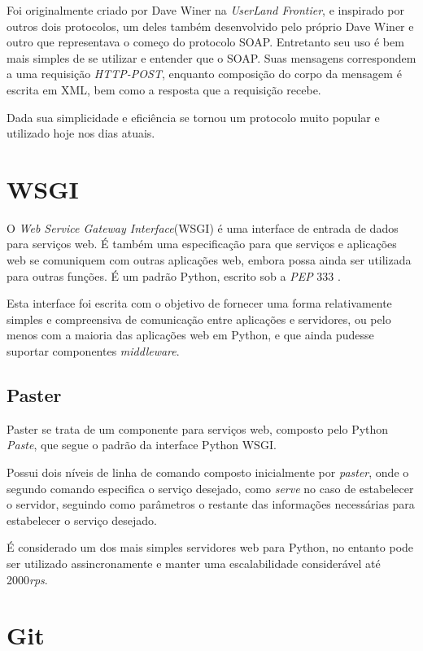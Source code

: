 Foi originalmente criado por Dave Winer na \textit{UserLand Frontier}, e inspirado por outros dois protocolos, um deles também desenvolvido pelo próprio Dave Winer e outro que representava o começo do protocolo SOAP. Entretanto seu uso é bem mais simples de se utilizar e entender que o SOAP. Suas mensagens correspondem a uma requisição \textit{HTTP-POST}, enquanto composição do corpo da mensagem é escrita em XML, bem como a resposta que a requisição recebe.

Dada sua simplicidade e eficiência se tornou um protocolo muito popular e utilizado hoje nos dias atuais.


\section{WSGI}

O \textit{Web Service Gateway Interface}(WSGI) é uma interface de entrada de dados para serviços web. É também uma especificação para que serviços e aplicações web se comuniquem com outras aplicações web, embora possa ainda ser utilizada para outras funções. É um padrão Python, escrito sob a \textit{PEP} 333 \cite{WSGI}.

Esta interface foi escrita com o objetivo de fornecer uma forma relativamente simples e compreensiva de comunicação entre aplicações e servidores, ou pelo menos com a maioria das aplicações web em Python, e que ainda pudesse suportar componentes \textit{middleware}.


\subsection{Paster}

Paster se trata de um componente para serviços web, composto pelo Python \textit{Paste}, que segue o padrão da interface Python WSGI.

Possui dois níveis de linha de comando composto inicialmente por \textit{paster}, onde o segundo comando especifica o serviço desejado, como \textit{serve} no caso de estabelecer o servidor, seguindo como parâmetros o restante das informações necessárias para estabelecer o serviço desejado.

É considerado um dos mais simples servidores web para Python, no entanto pode ser utilizado assincronamente e manter uma escalabilidade considerável até 2000\textit{rps}.


\section{Git}

